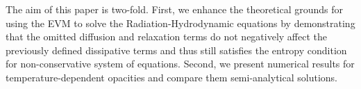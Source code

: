 \documentclass[times,doublespace]{fldauth}%
\begin{document}
The aim of this paper is two-fold. 
First, we enhance the theoretical grounds for using the EVM to solve the 
Radiation-Hydrodynamic equations by demonstrating that the omitted diffusion
and relaxation terms do not negatively affect the previously defined dissipative terms and thus still satisfies the 
entropy condition for non-conservative system of equations. %
Second, we present numerical results for temperature-dependent opacities and compare them semi-analytical solutions.

\end{document}

